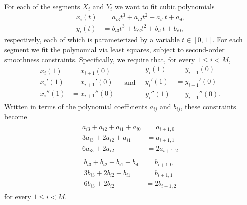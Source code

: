 \documentclass[letterpaper,12pt]{article}
\begin{document}
\begin{enumerate}
  For each of the segments $X_i$ and $Y_i$ we want to fit cubic polynomials
  \begin{align*}
    x_i(t) &= a_{i3}t^3 + a_{i2}t^2 + a_{i1}t + a_{i0} \\
    y_i(t) &= b_{i3}t^3 + b_{i2}t^2 + b_{i1}t + b_{i0},
  \end{align*}
  respectively, each of which is parameterized by a variable
  $t \in [0, 1]$. For each segment we fit the polynomial via least
  squares, subject to second-order smoothness
  constraints. Specifically, we require that, for every $1 \leq i < M$,
  \begin{equation*}
    \begin{aligned}
      x_i(1) &= x_{i+1}(0) \\
      x_i'(1) &= x_{i+1}'(0) \\
      x_i''(1) &= x_{i+1}''(0)
    \end{aligned}
    \quad \text{and} \quad
    \begin{aligned}
      y_i(1) &= y_{i+1}(0) \\
      y_i'(1) &= y_{i+1}'(0) \\
      y_i''(1) &= y_{i+1}''(0).
    \end{aligned}
  \end{equation*}
  Written in terms of the polynomial coefficients $a_{ij}$ and
  $b_{ij}$, these constraints become
  \begin{align} \label{eq:a_constraints}
    \begin{split}
      a_{i3} + a_{i2} + a_{i1} + a_{i0} &= a_{i+1,0} \\
      3a_{i3} + 2a_{i2} + a_{i1} &= a_{i+1,1} \\
      6a_{i3} + 2a_{i2} &= 2a_{i+1,2}
    \end{split}
  \end{align}
  \begin{align} \label{eq:b_constraints}
    \begin{split}
      b_{i3} + b_{i2} + b_{i1} + b_{i0} &= b_{i+1,0} \\
      3b_{i3} + 2b_{i2} + b_{i1} &= b_{i+1,1} \\
      6b_{i3} + 2b_{i2} &= 2b_{i+1,2}
    \end{split}
  \end{align}
  for every $1 \leq i < M$.


\end{enumerate}
\end{document}
